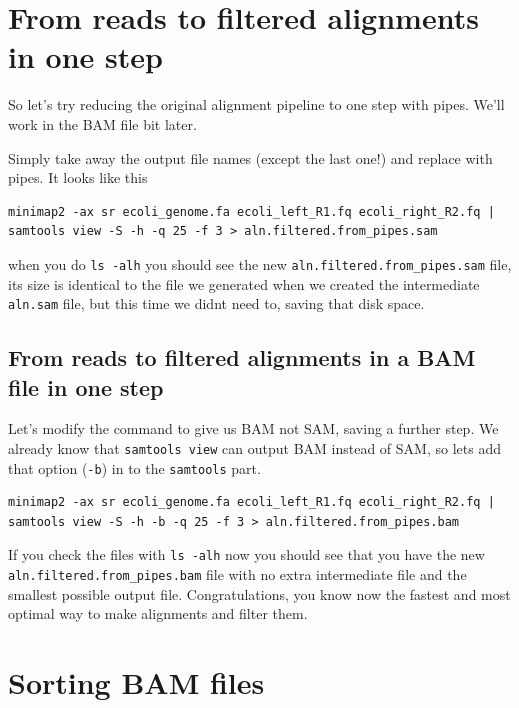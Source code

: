 \documentclass[]{book}
\begin{document}
\hypertarget{from-reads-to-filtered-alignments-in-one-step}{%
\section{From reads to filtered alignments in one step}\label{from-reads-to-filtered-alignments-in-one-step}}

So let's try reducing the original alignment pipeline to one step with pipes. We'll work in the BAM file bit later.

Simply take away the output file names (except the last one!) and replace with pipes. It looks like this

\begin{verbatim}
minimap2 -ax sr ecoli_genome.fa ecoli_left_R1.fq ecoli_right_R2.fq | samtools view -S -h -q 25 -f 3 > aln.filtered.from_pipes.sam
\end{verbatim}

when you do \texttt{ls\ -alh} you should see the new \texttt{aln.filtered.from\_pipes.sam} file, its size is identical to the file we generated when we created the intermediate \texttt{aln.sam} file, but this time we didnt need to, saving that disk space.

\hypertarget{from-reads-to-filtered-alignments-in-a-bam-file-in-one-step}{%
\subsection{From reads to filtered alignments in a BAM file in one step}\label{from-reads-to-filtered-alignments-in-a-bam-file-in-one-step}}

Let's modify the command to give us BAM not SAM, saving a further step. We already know that \texttt{samtools\ view} can output BAM instead of SAM, so lets add that option (\texttt{-b}) in to the \texttt{samtools} part.

\begin{verbatim}
minimap2 -ax sr ecoli_genome.fa ecoli_left_R1.fq ecoli_right_R2.fq | samtools view -S -h -b -q 25 -f 3 > aln.filtered.from_pipes.bam
\end{verbatim}

If you check the files with \texttt{ls\ -alh} now you should see that you have the new \texttt{aln.filtered.from\_pipes.bam} file with no extra intermediate file and the smallest possible output file. Congratulations, you know now the fastest and most optimal way to make alignments and filter them.

\hypertarget{sorting-bam-files}{%
\section{Sorting BAM files}\label{sorting-bam-files}}
\end{document}
